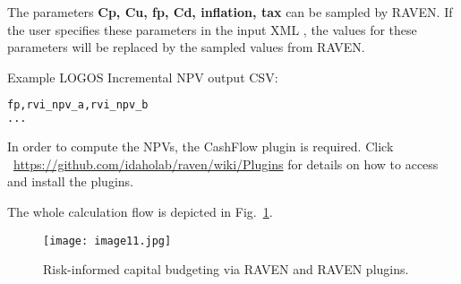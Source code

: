 The parameters \textbf{Cp, Cu, fp, Cd, inflation, tax} can be sampled by RAVEN.
If the user specifies these parameters in the input XML ,
the values for these parameters will be replaced by the sampled values from RAVEN.

Example LOGOS Incremental NPV output CSV:
\begin{lstlisting}[language=python]
fp,rvi_npv_a,rvi_npv_b
...
\end{lstlisting}

\nb In order to compute the NPVs, the CashFlow plugin is required.
Click ~\url{https://github.com/idaholab/raven/wiki/Plugins} for
details on how to access and install the plugins.

The whole calculation flow is depicted in Fig.~\ref{fig:LogosRAVEN}.


\begin{figure}
    \centering
    \centerline{\texttt{[image: image11.jpg]}}
    \caption{Risk-informed capital budgeting via RAVEN and RAVEN plugins.}
    \label{fig:LogosRAVEN}
\end{figure}

